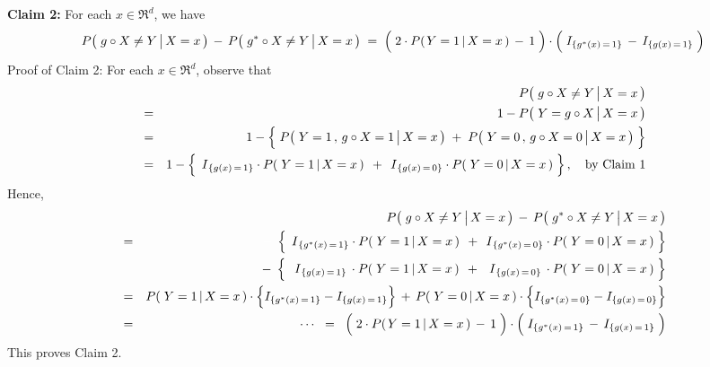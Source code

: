 \vskip 0.8cm
\noindent
\textbf{Claim 2:}\; For each $x \in \Re^{d}$, we have
\begin{equation*}
P\!\left(\,\left. g \overset{{\color{white}.}}{\circ} X \neq Y \,\right\vert X = x \,\right)
\, - \,
P\!\left(\,\left. g^{*} \overset{{\color{white}.}}{\circ} X \neq Y \,\right\vert X = x \,\right)
\; = \;
	\left(\; 2 \cdot P\!\left(\left.Y=1\,\right\vert X =x \,\right) \,\overset{{\color{white}.}}{-}\, 1 \;\right)
	\cdot
	\left(\; I_{\{g^{*}(x)\,=\,1\}} \,\overset{{\color{white}.}}{-}\, I_{\{g(x)\,=\,1\}} \;\right)
\end{equation*}
Proof of Claim 2:\; For each $x \in \Re^{d}$, observe that
\begin{eqnarray*}
&&
	P\!\left(\,\left. \overset{{\color{white}.}}{g} \circ X \neq Y \,\right\vert X = x \,\right)
\\
&=&
	1 - P\!\left(\,\left. Y = \overset{{\color{white}.}}{g} \circ X \,\right\vert X = x \,\right)
\\
&=&
	1 - \left\{\;
		\overset{{\color{white}.}}{P}\!\left(\,\left. Y = 1 \,,\, \overset{{\color{white}.}}{g} \circ X = 1 \,\right\vert X = x \,\right)
		\; + \;
		P\!\left(\,\left. Y = 0 \,,\, \overset{{\color{white}.}}{g} \circ X = 0 \,\right\vert X = x \,\right)
		\;\right\}
\\
&=&
	1 - \left\{\;
		\,\overset{{\color{white}.}}{I}_{\{g(x)\,=\,1\}} \cdot P\!\left(\,\left. Y = 1 \,\right\vert X = x \,\right)\,
		\; + \;
		\,\overset{{\color{white}.}}{I}_{\{g(x)\,=\,0\}} \cdot P\!\left(\,\left. Y = 0 \,\right\vert X = x \,\right)
		\;\right\},
	\quad
	\textnormal{by Claim 1}
\end{eqnarray*}
Hence,
\begin{eqnarray*}
&&
	P\!\left(\,\left. g \overset{{\color{white}.}}{\circ} X \neq Y \,\right\vert X = x \,\right)
	\, - \,
	P\!\left(\,\left. g^{*} \overset{{\color{white}.}}{\circ} X \neq Y \,\right\vert X = x \,\right)
\\
&=&
	{\color{white}- \;}
	\left\{\;
		\,\overset{{\color{white}.}}{I}_{\{g^{*}(x)\,=\,1\}} \cdot P\!\left(\,\left. Y = 1 \,\right\vert X = x \,\right)\,
		\; + \;
		\,\overset{{\color{white}.}}{I}_{\{g^{*}(x)\,=\,0\}} \cdot P\!\left(\,\left. Y = 0 \,\right\vert X = x \,\right)
		\;\right\}
\\
&&
	- \;
	\left\{\;
		\,\;\overset{{\color{white}.}}{I}_{\{g(x)\,=\,1\}}\, \cdot P\!\left(\,\left. Y = 1 \,\right\vert X = x \,\right)\,
		\; + \;
		\,\;\overset{{\color{white}.}}{I}_{\{g(x)\,=\,0\}}\, \cdot P\!\left(\,\left. Y = 0 \,\right\vert X = x \,\right)
		\;\right\}
\\
&=&
	P\!\left(\,\left. Y = 1 \,\right\vert X = x \,\right) \cdot \left\{ I_{\{g^{*}(x)\,=\,1\}} \overset{{\color{white}.}}{-} I_{\{g(x)\,=\,1\}} \right\}
	\,+\,
	P\!\left(\,\left. Y = 0 \,\right\vert X = x \,\right) \cdot \left\{ I_{\{g^{*}(x)\,=\,0\}} \overset{{\color{white}.}}{-} I_{\{g(x)\,=\,0\}} \right\}
\\
&=&
	\cdots
	\;\; = \;\;
	\left(\; 2 \cdot P\!\left(\left.Y=1\,\right\vert X =x \,\right) \,\overset{{\color{white}.}}{-}\, 1 \;\right)
	\cdot
	\left(\; I_{\{g^{*}(x)\,=\,1\}} \,\overset{{\color{white}.}}{-}\, I_{\{g(x)\,=\,1\}} \;\right)
\end{eqnarray*}
This proves Claim 2.

